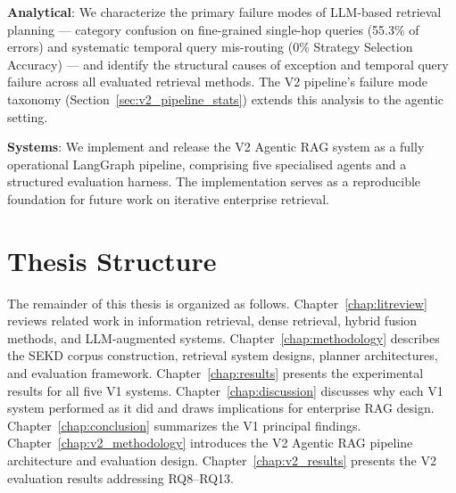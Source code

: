 \textbf{Analytical}: We characterize the primary failure modes of LLM-based retrieval planning --- category confusion on fine-grained single-hop queries (55.3\% of errors) and systematic temporal query mis-routing (0\% Strategy Selection Accuracy) --- and identify the structural causes of exception and temporal query failure across all evaluated retrieval methods. The V2 pipeline's failure mode taxonomy (Section~\ref{sec:v2_pipeline_stats}) extends this analysis to the agentic setting.

\textbf{Systems}: We implement and release the V2 Agentic RAG system as a fully operational LangGraph pipeline, comprising five specialised agents and a structured evaluation harness. The implementation serves as a reproducible foundation for future work on iterative enterprise retrieval.

\section{Thesis Structure}
\label{sec:intro_structure}

The remainder of this thesis is organized as follows. Chapter~\ref{chap:litreview} reviews related work in information retrieval, dense retrieval, hybrid fusion methods, and LLM-augmented systems. Chapter~\ref{chap:methodology} describes the SEKD corpus construction, retrieval system designs, planner architectures, and evaluation framework. Chapter~\ref{chap:results} presents the experimental results for all five V1 systems. Chapter~\ref{chap:discussion} discusses why each V1 system performed as it did and draws implications for enterprise RAG design. Chapter~\ref{chap:conclusion} summarizes the V1 principal findings. Chapter~\ref{chap:v2_methodology} introduces the V2 Agentic RAG pipeline architecture and evaluation design. Chapter~\ref{chap:v2_results} presents the V2 evaluation results addressing RQ8--RQ13.
